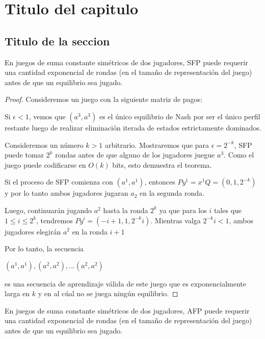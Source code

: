 \chapter{Titulo del capitulo}  \label{cap1}

\section{Titulo de la seccion} \label{cap1:sec1}

\begin{theorem}
    En juegos de suma constante simétricos de dos jugadores, SFP puede requerir una cantidad exponencial de rondas
    (en el tamaño de representación del juego) antes de que un equilibrio sea jugado.
\end{theorem}

\begin{proof}
    Consideremos un juego con la siguiente matriz de pagos:

    

    Si $\epsilon < 1$, vemos que $(a^3, a^3)$ es el único
    equilibrio de Nash por ser el único perfil restante luego de realizar eliminación iterada de estados estrictamente dominados.

    Consideremos un número $k > 1$ arbitrario. Mostraremos que para $\epsilon = 2^{-k}$, SFP puede tomar $2^k$ rondas antes de que
    alguno de los jugadores juegue $a^3$. Como el juego puede codificarse en $O(k)$ bits, esto demuestra el teorema.

    Si el proceso de SFP comienza con $(a^1, a^1)$, entonces $Py^1 = x^1Q = (0, 1, 2^{-k})$ y por lo tanto ambos jugadores jugaran $a_2$
    en la segunda ronda.

    Luego, continuarán jugando $a^2$ hasta la ronda $2^k$ ya que para los $i$ tales que $1 \le i \le 2^k$,
    tendremos $Py^i = (-i + 1, 1, 2^{-k}i)$. Mientras valga $2^{-k}i < 1$, ambos jugadores elegirán $a^2$ en la ronda $i + 1$

    Por lo tanto, la secuencia

    \begin{math}
        (a^1, a^1), (a^2, a^2), ... (a^2, a^2)
    \end{math}

    es una secuencia de aprendizaje válida de este juego que es exponencialmente larga en $k$ y en al cúal no se juega ningún equilibrio.
\end{proof}

\begin{theorem}
    En juegos de suma constante simétricos de dos jugadores, AFP puede requerir una cantidad exponencial de rondas
    (en el tamaño de representación del juego) antes de que un equilibrio sea jugado.
\end{theorem}

